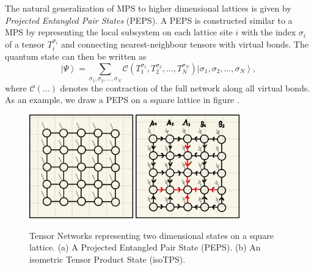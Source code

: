 The natural generalization of MPS to higher dimensional lattices is given by \textit{Projected Entangled Pair States} (PEPS). A PEPS is constructed similar to a MPS by representing the local subsystem on each lattice site $i$ with the index $\sigma_i$ of a tensor $T_i^{\sigma_i}$ and connecting nearest-neighbour tensors with virtual bonds. The quantum state can then be written as
\begin{equation}
	\label{eq:PEPS_definition_general}
	\left|\Psi\right\rangle = \sum_{\sigma_1,\sigma_2,\dots,\sigma_N} \mathcal{C}\left(T_1^{\sigma_1}, T_2^{\sigma_2}, \dots, T_N^{\sigma_N}\right) \left|\sigma_1,\sigma_2,\dots,\sigma_N\right\rangle,
\end{equation}
where $\mathcal{C}(\dots)$ denotes the contraction of the full network along all virtual bonds. As an example, we draw a PEPS on a square lattice in figure . \par
\begin{figure}
	\centering
	\subcaptionbox{\label{fig:square_PEPS}}
	{%
		\includegraphics[width=0.4\textwidth]{figures/Tensor_Networks/PEPS_square.jpeg}
	}
	\subcaptionbox{\label{fig:square_isoTPS}}
	{%
		\includegraphics[width=0.4\textwidth]{figures/Tensor_Networks/isoTPS_square.jpeg}
	}
	\caption{Tensor Networks representing two dimensional states on a square lattice. (a) A Projected Entangled Pair State (PEPS). (b) An isometric Tensor Product State (isoTPS).}
	\label{fig:square_PEPS_and_isoTPS}
\end{figure}
